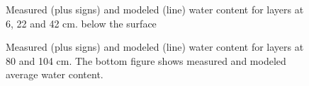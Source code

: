 \begin{figure}
\centerline{
}
\label{fig:mesmodtheta1}
\caption{Measured (plus signs) and modeled (line) water content for layers 
at 6, 22 and 42 cm. below the surface}
\end{figure}

\begin{figure}
\centerline{
}
\label{fig:mesmodtheta2}
\caption{Measured (plus signs) and modeled (line) water content for layers 
at 80 and 104 cm. The bottom figure shows measured and modeled average water content.}
\end{figure}

\begin{figure}
\centerline{
}
\label{fig:watbal1}
\caption{}
\end{figure}

\begin{figure}
\centerline{
}
\label{fig:watbal2}
\caption{}
\end{figure}



